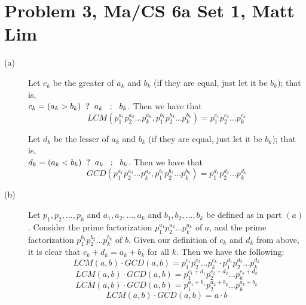 \documentclass{article}
\begin{document}
\section*{Problem 3, Ma/CS 6a Set 1, Matt Lim}
\begin{description}
    \item[(a)]
        Let $c_k$ be the greater of $a_k$ and $b_k$ (if they are equal,
        just let it be $b_k$); that is, \\
        $c_k = (a_k > b_k) \hspace{2mm} ? \hspace{2mm} a_k \hspace{2mm} :
        \hspace{2mm} b_k$. Then we have that
        \[ LCM(p_1^{a_1}p_2^{a_2}...p_k^{a_k}, p_1^{b_1}p_2^{b_2}...
        p_k^{b_k}) = p_1^{c_1}p_2^{c_2}...p_k^{c_k} \]

        Let $d_k$ be the lesser of $a_k$ and $b_k$ (if they are equal,
        just let it be $b_k$); that is, \\
        $d_k = (a_k < b_k) \hspace{2mm} ? \hspace{2mm} a_k \hspace{2mm} :
        \hspace{2mm} b_k$. Then we have that
        \[ GCD(p_1^{a_1}p_2^{a_2}...p_k^{a_k}, p_1^{b_1}p_2^{b_2}...
        p_k^{b_k}) = p_1^{d_1}p_2^{d_2}...p_k^{d_k} \]
    \item[(b)]
        Let $p_1,p_2,...,p_k$ and $a_1,a_2,...,a_k$ and $b_1,b_2,...,b_k$ be defined
        as in part $(a)$.
        Consider the prime factorization $p_1^{a_1}p_2^{a_2}...p_k^{a_k}$
        of $a$, and the prime factorization $p_1^{b_1}p_2^{b_2}...
        p_k^{b_k}$ of $b$.
        Given our definition of $c_k$ and $d_k$ from above, it is clear that
        $c_k + d_k = a_k + b_k$ for all $k$. Then we have the following:
        \[ LCM(a,b) \cdot GCD(a,b) = p_1^{c_1}p_2^{c_2}...p_k^{c_k} \cdot
        p_1^{d_1}p_2^{d_2}...p_k^{d_k} \]
        \[ LCM(a,b) \cdot GCD(a,b) = p_1^{c_1 + d_1}p_2^{c_2 + d_2}...p_k^{c_k +
        d_k} \]
        \[ LCM(a,b) \cdot GCD(a,b) = p_1^{a_1 + b_1}p_2^{a_2 + b_2}...p_k^{a_k +
        b_k} \]
        \[ LCM(a,b) \cdot GCD(a,b) = a \cdot b \]
\end{description}
\newpage
\end{document}
